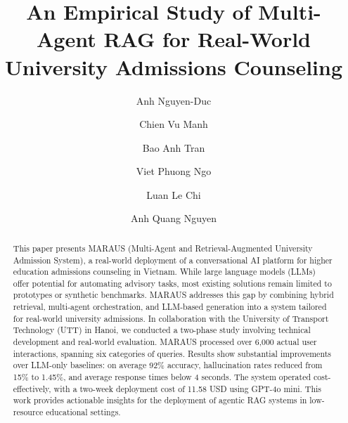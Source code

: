 \documentclass[runningheads]{llncs}
\begin{document}
%
\title{An Empirical Study of Multi-Agent RAG for Real-World University Admissions Counseling}
%
%
\author{Anh Nguyen-Duc \and
Chien Vu Manh \and
Bao Anh Tran \and Viet Phuong Ngo  \and Luan Le Chi \and Anh Quang Nguyen
}
%
%
%
\maketitle              %
%
\begin{abstract}
This paper presents MARAUS (Multi-Agent and Retrieval-Augmented University Admission System), a real-world deployment of a conversational AI platform for higher education admissions counseling in Vietnam. While large language models (LLMs) offer potential for automating advisory tasks, most existing solutions remain limited to prototypes or synthetic benchmarks. MARAUS addresses this gap by combining hybrid retrieval, multi-agent orchestration, and LLM-based generation into a system tailored for real-world university admissions. In collaboration with the University of Transport Technology (UTT) in Hanoi, we conducted a two-phase study involving technical development and real-world evaluation. MARAUS processed over 6,000 actual user interactions, spanning six categories of queries. Results show substantial improvements over LLM-only baselines: on average 92\% accuracy, hallucination rates reduced from 15\% to 1.45\%, and average response times below 4 seconds. The system operated cost-effectively, with a two-week deployment cost of 11.58 USD using GPT-4o mini. This work provides actionable insights for the deployment of agentic RAG systems in low-resource educational settings.

\end{abstract}
%
%
%
\end{document}
